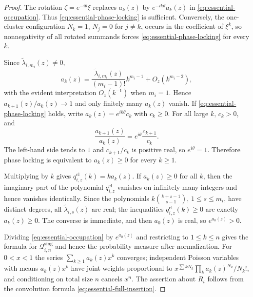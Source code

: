 \documentclass[reqno]{article}
\theoremstyle{definition}
\theoremstyle{remark}
\theoremstyle{plain}
\begin{document}
\begin{proof}
The rotation $\zeta=e^{-i\theta}\xi$ replaces $a_k(z)$ by $e^{-ik\theta}a_k(z)$ in \eqref{eq:essential-occupation}. Thus \eqref{eq:essential-phase-locking} is sufficient. Conversely, the one-cluster configuration $N_k=1$, $N_j=0$ for $j\ne k$, occurs in the coefficient of $\xi^k$, so nonnegativity of all rotated summands forces \eqref{eq:essential-phase-locking} for every $k$.

Since $\widetilde\lambda_{i,m_i}(z)\ne0$,
\[
a_k(z)=\frac{\widetilde\lambda_{i,m_i}(z)}{(m_i-1)!}k^{m_i-1}+O_z(k^{m_i-2}),
\]
with the evident interpretation $O_z(k^{-1})$ when $m_i=1$. Hence $a_{k+1}(z)/a_k(z)\to1$ and only finitely many $a_k(z)$ vanish. If \eqref{eq:essential-phase-locking} holds, write $a_k(z)=e^{ik\theta}c_k$ with $c_k\ge0$. For all large $k$, $c_k>0$, and
\[
\frac{a_{k+1}(z)}{a_k(z)}=e^{i\theta}\frac{c_{k+1}}{c_k}.
\]
The left-hand side tends to $1$ and $c_{k+1}/c_k$ is positive real, so $e^{i\theta}=1$. Therefore phase locking is equivalent to $a_k(z)\ge0$ for every $k\ge1$.

Multiplying by $k$ gives $q^{\mathrm{cl}}_{i,z}(k)=ka_k(z)$. If $a_k(z)\ge0$ for all $k$, then the imaginary part of the polynomial $q^{\mathrm{cl}}_{i,z}$ vanishes on infinitely many integers and hence vanishes identically. Since the polynomials $k\binom{k+s-1}{s-1}$, $1\le s\le m_i$, have distinct degrees, all $\widetilde\lambda_{i,s}(z)$ are real; the inequalities $q^{\mathrm{cl}}_{i,z}(k)\ge0$ are exactly $a_k(z)\ge0$. The converse is immediate, and then $a_0(z)$ is real, so $e^{a_0(z)}>0$.

Dividing \eqref{eq:essential-occupation} by $e^{a_0(z)}$ and restricting to $1\le k\le n$ gives the formula for $\mathcal Q^{\mathrm{sing}}_{i,n}$ and hence the probability measure after normalization. For $0<x<1$ the series $\sum_{k\ge1}a_k(z)x^k$ converges; independent Poisson variables with means $a_k(z)x^k$ have joint weights proportional to $x^{\sum kN_k}\prod_k a_k(z)^{N_k}/N_k!$, and conditioning on total size $n$ cancels $x^n$. The assertion about $R_i$ follows from the convolution formula \eqref{eq:essential-full-insertion}.
\end{proof}
\end{document}
